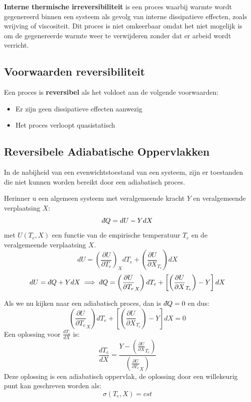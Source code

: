 \begin{definition}
    \textbf{Interne thermische irreversibiliteit} is een proces waarbij warmte wordt gegenereerd binnen een systeem als gevolg van interne dissipatieve effecten, zoals wrijving of viscositeit.
    Dit proces is niet omkeerbaar omdat het niet mogelijk is om de gegenereerde warmte weer te verwijderen zonder dat er arbeid wordt verricht.
\end{definition}

\subsection{Voorwaarden reversibiliteit}

\begin{definition}[Reversibiliteit]
    Een proces is \textbf{reversibel} als het voldoet aan de volgende voorwaarden:
    \begin{itemize}
        \item Er zijn geen dissipatieve effecten aanwezig
        \item Het proces verloopt quasistatisch
    \end{itemize}
\end{definition}

\subsection{Reversibele Adiabatische Oppervlakken}

\begin{postulate}
    In de nabijheid van een evenwichtstoestand van een systeem, zijn er toestanden die niet kunnen worden bereikt door een adiabatisch proces.
\end{postulate}

Herinner u een algemeen systeem met veralgemeende kracht \(Y\) en veralgemeende verplaatsing \(X\):
\[\dbar Q = dU -YdX\]
met \(U(T_e,X)\) een functie van de empirische temperatuur \(T_e\) en de veralgemeende verplaatsing \(X\).
\[
d U = \left(\frac{\partial U}{\partial T_e}\right)_X dT_e + \left(\frac{\partial U}{\partial X}_{T_e}\right) dX
\]
\[
dU = \dbar Q + YdX \implies \dbar Q = \left(\frac{\partial U}{\partial T_e}_{X}\right) dT_e + \left[\left(\frac{\partial U}{\partial X}_{T_e}\right)  - Y\right]dX
\]

Als we nu kijken naar een adiabatisch proces, dan is \(\dbar Q = 0\) en dus:
\[\left(\frac{\partial U}{\partial T_e}_{X}\right) dT_e + \left[\left(\frac{\partial U}{\partial X}_{T_e}\right)  - Y\right]dX = 0\]
Een oplossing voor \(\frac{dT_e}{dX}\) is:
\[\frac{dT_e}{dX} = \frac{Y - \left(\frac{\partial U}{\partial X}_{T_e}\right)}{\left(\frac{\partial U}{\partial T_e}_{X}\right)}\]
Deze oplossing is een adiabatisch oppervlak, de oplossing door een willekeurig punt kan geschreven worden als:
\[
\sigma (T_e ,X) = cst
\]

